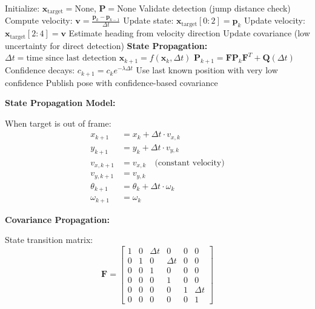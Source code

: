 \documentclass[11pt]{article}
\begin{document}
\begin{algorithm}[H]
\caption{Target State Estimation with Propagation}
\begin{algorithmic}[1]
\State Initialize: $\mathbf{x}_{\text{target}} = \text{None}$, $\mathbf{P} = \text{None}$
        \State Validate detection (jump distance check)
            \State Compute velocity: $\mathbf{v} = \frac{\mathbf{p}_k - \mathbf{p}_{k-1}}{\Delta t}$
            \State Update state: $\mathbf{x}_{\text{target}}[0:2] = \mathbf{p}_k$
            \State Update velocity: $\mathbf{x}_{\text{target}}[2:4] = \mathbf{v}$
            \State Estimate heading from velocity direction
            \State Update covariance (low uncertainty for direct detection)
        \EndIf
        \State \textbf{State Propagation:}
        \State $\Delta t = \text{time since last detection}$
        \State $\mathbf{x}_{k+1} = f(\mathbf{x}_k, \Delta t)$ 
        \State $\mathbf{P}_{k+1} = \mathbf{F} \mathbf{P}_k \mathbf{F}^T + \mathbf{Q}(\Delta t)$
        \State Confidence decays: $c_{k+1} = c_k e^{-\lambda \Delta t}$
    \Else
        \State Use last known position with very low confidence
    \EndIf
    \State Publish pose with confidence-based covariance
\EndLoop
\end{algorithmic}
\end{algorithm}

\textbf{State Propagation Model:}

When target is out of frame:
\begin{align}
x_{k+1} &= x_k + \Delta t \cdot v_{x,k} \\
y_{k+1} &= y_k + \Delta t \cdot v_{y,k} \\
v_{x,k+1} &= v_{x,k} \quad \text{(constant velocity)} \\
v_{y,k+1} &= v_{y,k} \\
\theta_{k+1} &= \theta_k + \Delta t \cdot \omega_k \\
\omega_{k+1} &= \omega_k
\end{align}

\textbf{Covariance Propagation:}

State transition matrix:
\[
\mathbf{F} = \begin{bmatrix}
1 & 0 & \Delta t & 0 & 0 & 0 \\
0 & 1 & 0 & \Delta t & 0 & 0 \\
0 & 0 & 1 & 0 & 0 & 0 \\
0 & 0 & 0 & 1 & 0 & 0 \\
0 & 0 & 0 & 0 & 1 & \Delta t \\
0 & 0 & 0 & 0 & 0 & 1
\end{bmatrix}
\]
\end{document}
